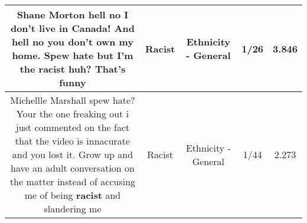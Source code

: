 \documentclass[11pt]{article}
\newlength\mylength
\begin{document}
\begin{center}
\begin{longtable}{|C{.65\mylength}|C{.30\mylength}|C{.12\mylength}|C{.12\mylength}|C{.12\mylength}|}
  \small Shane Morton hell no I don't live in Canada! And hell no you don't own my home. Spew hate but I'm the \textbf{racist} huh? That's funny\normalsize   & Racist & Ethnicity - General & 1/26 & 3.846 \\  \hline
  \small Michellle Marshall spew hate? Your the one freaking out i just commented on the fact that the video is innacurate and you lost it. Grow up and have an adult conversation on the matter instead of accusing me of being \textbf{racist} and slandering me\normalsize   & Racist & Ethnicity - General & 1/44 & 2.273 \\  \hline
  
\end{longtable}
\end{center}
\end{document}
